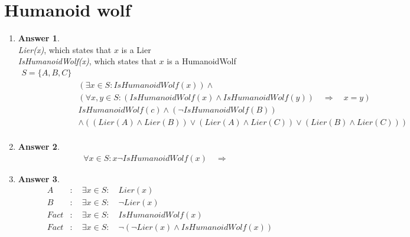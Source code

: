 \documentclass[a4paper]{article}
\renewcommand{\(}{\left(}
\renewcommand{\)}{\right)}
\theoremstyle{plain}
\theoremstyle{plain}
\theoremstyle{definition}
\newtheorem*{answer}{Answer}
\begin{document}
\section{Humanoid wolf}
\quad
\begin{enumerate}[label*=\alph*.,ref=\alph*]

\item \quad
\begin{shaded}
\begin{answer}
$$$$
\textit{Lier(x)}, which states that $x$ is a Lier \\
\textit{IsHumanoidWolf(x)}, which states that $x$ is a HumanoidWolf
\begin{align*}
S = \{ A , B , C \} \\
&(\exists x \in S : IsHumanoidWolf(x)) \wedge \\
&( \forall x , y \in S : (IsHumanoidWolf(x) \wedge IsHumanoidWolf(y)) \quad \Rightarrow \quad x = y) \\
&IsHumanoidWolf(c) \wedge ( \neg IsHumanoidWolf(B)) \\
&\wedge ((Lier(A) \wedge Lier(B)) \vee (Lier(A) \wedge Lier(C)) \vee (Lier(B) \wedge Lier(C))) \\
\end{align*}
\end{answer}
\end{shaded}

\item \quad
\begin{shaded}
\begin{answer}
\begin{align*}
\forall x \in S : x \neg IsHumanoidWolf(x) \quad \Rightarrow \quad
\end{align*}
\end{answer}
\end{shaded}

\item \quad
\begin{shaded}
\begin{answer}
\begin{align*}
  A  &: \quad \exists x \in S : \quad Lier(x) \\
  B &: \quad \exists x \in S : \quad \neg Lier(x) \\
  Fact &: \quad \exists x \in S : \quad IsHumanoidWolf(x) \\
  Fact &: \quad \exists x \in S : \quad \neg (\neg Lier(x) \wedge IsHumanoidWolf(x))
\end{align*}
\end{answer}
\end{shaded}


\end{enumerate}
\end{document}
